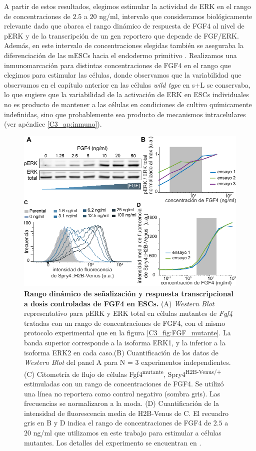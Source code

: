 \documentclass[./main.tex]{subfiles}
\begin{document}
A partir de estos resultados, elegimos estimular la actividad de ERK en el rango de concentraciones de $2.5$ a $20$ ng/ml, intervalo que consideramos biológicamente relevante dado que abarca el rango dinámico de respuesta de FGF4 al nivel de pERK y de la transcripción de un gen reportero que depende de FGF/ERK. Además, en este intervalo de concentraciones elegidas también se aseguraba la diferenciación de las mESCs hacia el endodermo primitivo \cite{Raina2021}. Realizamos una inmunomarcación para distintas concentraciones de FGF4 en el rango que elegimos para estimular las células, donde observamos que la variabilidad que observamos en el capítulo anterior en las células \textit{wild type} en s+L se conservaba, lo que sugiere que la variabilidad de la activación de ERK en ESCs individuales no es producto de mantener a las células en condiciones de cultivo químicamente indefinidas, sino que probablemente sea producto de mecanismos intracelulares (ver apéndice \ref{C3_ap:inmuno}).


\begin{figure}
    \centering
    \includegraphics[width=1\columnwidth]{figures/chapter3/C3_FGF_conc.pdf} 
    \caption{
\textbf{Rango dinámico de señalización y respuesta transcripcional a dosis controladas de FGF4 en ESCs.} (A) \textit{Western Blot} representativo para pERK y ERK total en células mutantes de \textit{Fgf4} tratadas con un rango de concentraciones de FGF4, con el mismo protocolo experimental que en la figura \ref{C3_fig:FGF_mutante}. La banda superior corresponde a la isoforma ERK1, y la inferior a la isoforma ERK2 en cada caso.(B) Cuantificación de los datos de \textit{Western Blot} del panel A para N = 3 experimentos independientes. (C) Citometría de flujo de células Fgf4\textsuperscript{mutante}, Spry4\textsuperscript{H2B-Venus/+} estimuladas con un rango de concentraciones de FGF4. Se utilizó una línea no reportera como control negativo (sombra gris). Las frecuencias se normalizaron a la moda. (D) Cuantificación de la intensidad de fluorescencia media de H2B-Venus de C. El recuadro gris en B y D indica el rango de concentraciones de FGF4 de $2.5$ a $20$ ng/ml que utilizamos en este trabajo para estimular a células mutantes. Los detalles del experimento se encuentran en \cite{Fabris2022}.}
    \label{C3_fig:FGF}
\end{figure}
\end{document}

